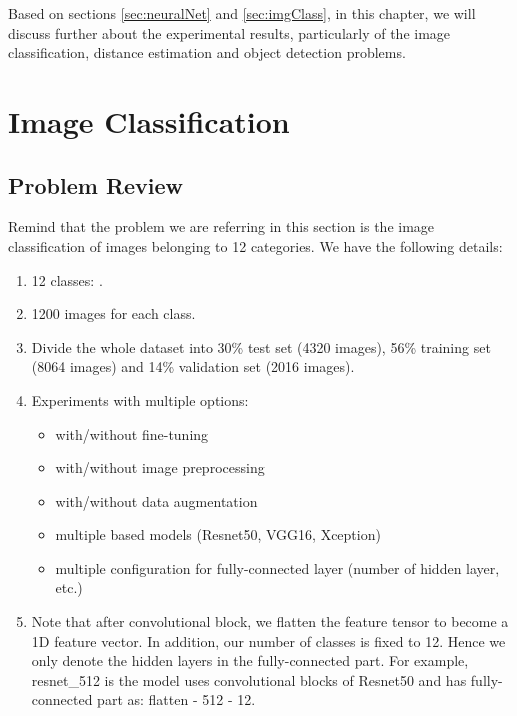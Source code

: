 \label{chap:ExpRes}
Based on sections \ref{sec:neuralNet} and \ref{sec:imgClass}, in this chapter, we will discuss further about the experimental results, particularly of the image classification, distance estimation and object detection problems.

\section{Image Classification}
\subsection{Problem Review}
Remind that the problem we are referring in this section is the image classification of images belonging to 12 categories. We have the following details:
\begin{enumerate}
	\item 12 classes: .
	\item 1200 images for each class.
	\item Divide the whole dataset into 30\% test set (4320 images), 56\% training set (8064 images) and 14\% validation set (2016 images).
	\item Experiments with multiple options: 
	\begin{itemize}
		\item with/without fine-tuning
		\item with/without image preprocessing
		\item with/without data augmentation
		\item multiple based models (Resnet50, VGG16, Xception)
		\item multiple configuration for fully-connected layer (number of hidden layer, etc.)
	\end{itemize} 
	\item Note that after convolutional block, we flatten the feature tensor to become a 1D feature vector. In addition, our number of classes is fixed to 12. Hence we only denote the hidden layers in the fully-connected part. For example, resnet\_512 is the model uses convolutional blocks of Resnet50 and has fully-connected part as: flatten - 512 - 12. 
\end{enumerate}

